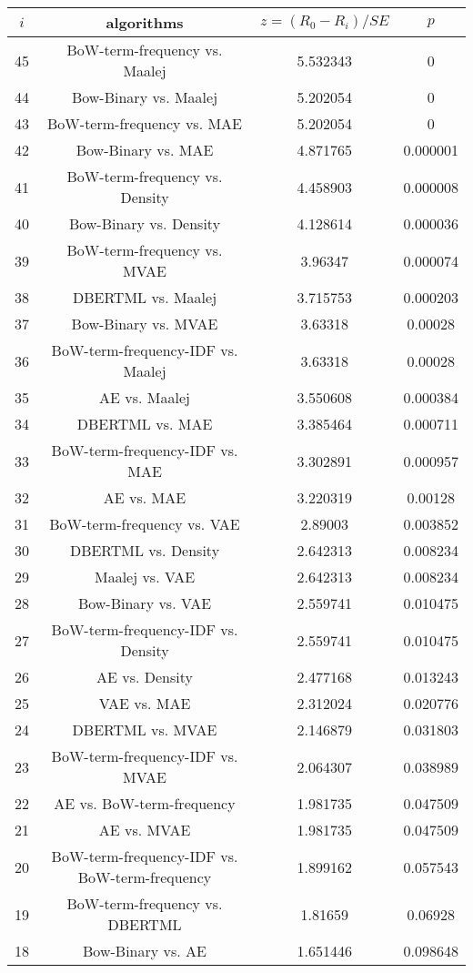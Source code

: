 \documentclass[a4paper,10pt]{article}
\begin{document}
\begin{landscape}
\begin{table}[!htp]
\centering\scriptsize
\begin{tabular}{cccc}
$i$&algorithms&$z=(R_0 - R_i)/SE$&$p$\\
\hline45&BoW-term-frequency vs. Maalej&5.532343&0\\
44&Bow-Binary vs. Maalej&5.202054&0\\
43&BoW-term-frequency vs. MAE&5.202054&0\\
42&Bow-Binary vs. MAE&4.871765&0.000001\\
41&BoW-term-frequency vs. Density&4.458903&0.000008\\
40&Bow-Binary vs. Density&4.128614&0.000036\\
39&BoW-term-frequency vs. MVAE&3.96347&0.000074\\
38&DBERTML vs. Maalej&3.715753&0.000203\\
37&Bow-Binary vs. MVAE&3.63318&0.00028\\
36&BoW-term-frequency-IDF vs. Maalej&3.63318&0.00028\\
35&AE vs. Maalej&3.550608&0.000384\\
34&DBERTML vs. MAE&3.385464&0.000711\\
33&BoW-term-frequency-IDF vs. MAE&3.302891&0.000957\\
32&AE vs. MAE&3.220319&0.00128\\
31&BoW-term-frequency vs. VAE&2.89003&0.003852\\
30&DBERTML vs. Density&2.642313&0.008234\\
29&Maalej vs. VAE&2.642313&0.008234\\
28&Bow-Binary vs. VAE&2.559741&0.010475\\
27&BoW-term-frequency-IDF vs. Density&2.559741&0.010475\\
26&AE vs. Density&2.477168&0.013243\\
25&VAE vs. MAE&2.312024&0.020776\\
24&DBERTML vs. MVAE&2.146879&0.031803\\
23&BoW-term-frequency-IDF vs. MVAE&2.064307&0.038989\\
22&AE vs. BoW-term-frequency&1.981735&0.047509\\
21&AE vs. MVAE&1.981735&0.047509\\
20&BoW-term-frequency-IDF vs. BoW-term-frequency&1.899162&0.057543\\
19&BoW-term-frequency vs. DBERTML&1.81659&0.06928\\
18&Bow-Binary vs. AE&1.651446&0.098648\\

\end{tabular}
\end{table}
\end{landscape}
\end{document}
